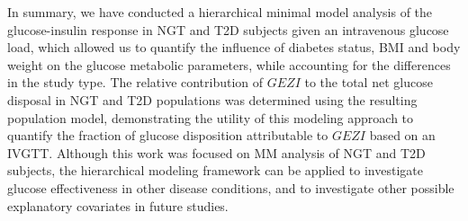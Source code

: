 \documentclass[utf8]{frontiersSCNS} %
\begin{document}
In summary, we have conducted a hierarchical minimal model analysis of the glucose-insulin response in NGT and T2D subjects given an intravenous glucose load, which allowed us to quantify the influence of diabetes status, BMI and body weight on the glucose metabolic parameters, while accounting for the differences in the study type. The relative contribution of $GEZI$ to the total net glucose disposal in NGT and T2D populations was determined using the resulting population model, demonstrating the utility of this modeling approach to quantify the fraction of glucose disposition attributable to $GEZI$ based on an IVGTT. Although this work was focused on MM analysis of NGT and T2D subjects, the hierarchical modeling framework can be applied to investigate glucose effectiveness in other disease conditions, and to investigate other possible explanatory covariates in future studies. 
 

\end{document}
